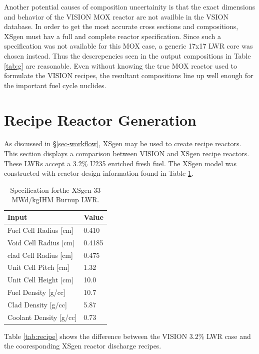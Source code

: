 \documentclass{article}
\begin{document}
Another potential causes of composition uncertainity is that the exact dimensions and behavior
of the VISION MOX reactor are not availble in the VSION database. In order to get the
most accurate cross sections and compositions, XSgen must hav a full and complete reactor
specification. Since such a specification was not available for this MOX case,
a generic 17x17 LWR core was chosen instead. Thus the descrepencies seen in the output
compositions in Table \ref{tab:g} are reasonable. Even without knowing the
true MOX reactor used to formulate the VISION recipes, the resultant compositions line
up well enough for the important fuel cycle nuclides.

\section{Recipe Reactor Generation}

As discussed in \S\ref{sec-workflow}, XSgen may be used to create recipe reactors.
This section displays a comparison between VISION and XSgen recipe reactors. These LWRs accept
a 3.2\% U235 enriched fresh fuel. The XSgen model was constructed with reactor design
information found in Table \ref{tab:xsgenstats}.

\begin{table}[!htb]
\centering
\caption{Specification forthe XSgen 33 MWd/kgIHM Burnup LWR.}
\label{tab:xsgenstats}
\begin{tabular}{ll}
Input & Value \\
\hline
Fuel Cell Radius [cm] & 0.410 \\
Void Cell Radius [cm] & 0.4185 \\
clad Cell Radius [cm] & 0.475 \\
Unit Cell Pitch  [cm] & 1.32 \\
Unit Cell Height [cm] & 10.0 \\
Fuel Density [g/cc] & 10.7 \\
Clad Density [g/cc] & 5.87 \\
Coolant Density [g/cc] & 0.73 \\
\end{tabular}
\end{table}

Table \ref{tab:recipe} shows the difference between the VISION 3.2\% LWR case and the
cooresponding XSgen reactor discharge recipes.
\end{document}
